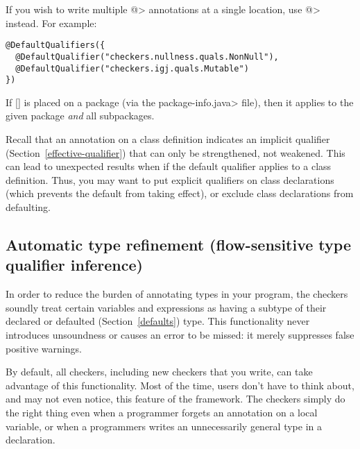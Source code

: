 If you wish to write multiple 
\<@> annotations at a single location,
use 
\<@> instead.  For example:

\begin{Verbatim}
@DefaultQualifiers({
  @DefaultQualifier("checkers.nullness.quals.NonNull"),
  @DefaultQualifier("checkers.igj.quals.Mutable")
})
\end{Verbatim}


If [] is placed on a package (via the
\<package-info.java> file), then it applies to the given package \emph{and}
all subpackages.

Recall that an annotation on a class definition indicates an implicit
qualifier (Section~\ref{effective-qualifier}) that can only be
strengthened, not weakened.  This can lead to unexpected results when if
the default qualifier applies to a class definition.  Thus, you may want to
put explicit qualifiers on class declarations (which prevents the default
from taking effect), or exclude class declarations from defaulting.




\subsection{Automatic type refinement (flow-sensitive type qualifier inference)\label{type-refinement}}

In order to reduce the burden of annotating types in your program, the
checkers soundly treat certain variables and expressions as having a
subtype of their declared or defaulted (Section~\ref{defaults})
type.  This functionality
never introduces unsoundness or causes an error to be missed:  it merely
suppresses false positive warnings.

By default, all checkers, including new checkers that you write, can take
advantage of this functionality.  Most of the time, users don't have to
think about, and may not even notice, this feature of the framework.  The
checkers simply do the right thing even when a programmer forgets an
annotation on a local variable, or when a programmers writes an
unnecessarily general type in a declaration.

